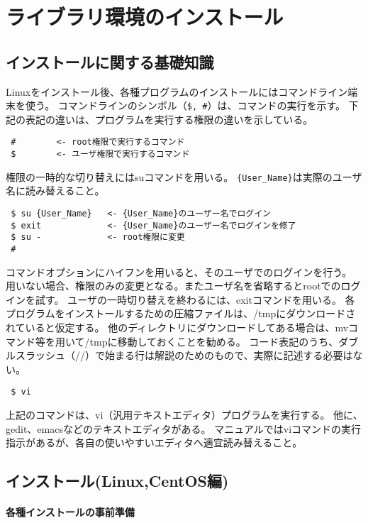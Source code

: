 \chapter{ライブラリ環境のインストール}
\label{sec:env_setting}

\section{インストールに関する基礎知識}

Linuxをインストール後、各種プログラムのインストールにはコマンドライン端末を使う。
コマンドラインのシンボル（\verb|$, #|）は、コマンドの実行を示す。
下記の表記の違いは、プログラムを実行する権限の違いを示している。

\begin{verbatim}
 #        <- root権限で実行するコマンド
 $        <- ユーザ権限で実行するコマンド
\end{verbatim}
権限の一時的な切り替えにはsuコマンドを用いる。
\verb|{User_Name}|は実際のユーザ名に読み替えること。
\begin{verbatim}
 $ su {User_Name}   <- {User_Name}のユーザー名でログイン
 $ exit             <- {User_Name}のユーザー名でログインを修了
 $ su -             <- root権限に変更
 #
\end{verbatim}

コマンドオプションにハイフンを用いると、そのユーザでのログインを行う。
用いない場合、権限のみの変更となる。またユーザ名を省略するとrootでのログインを試す。
ユーザの一時切り替えを終わるには、exitコマンドを用いる。
各プログラムをインストールするための圧縮ファイルは、/tmpにダウンロードされていると仮定する。
他のディレクトリにダウンロードしてある場合は、mvコマンド等を用いて/tmpに移動しておくことを勧める。
コード表記のうち、ダブルスラッシュ（//）で始まる行は解説のためのもので、実際に記述する必要はない。


\begin{verbatim}
 $ vi
\end{verbatim}

上記のコマンドは、vi（汎用テキストエディタ）プログラムを実行する。
他に、gedit、emacsなどのテキストエディタがある。
マニュアルではviコマンドの実行指示があるが、各自の使いやすいエディタへ適宜読み替えること。

\section{インストール(Linux,CentOS編)}

\subsubsection{各種インストールの事前準備}

